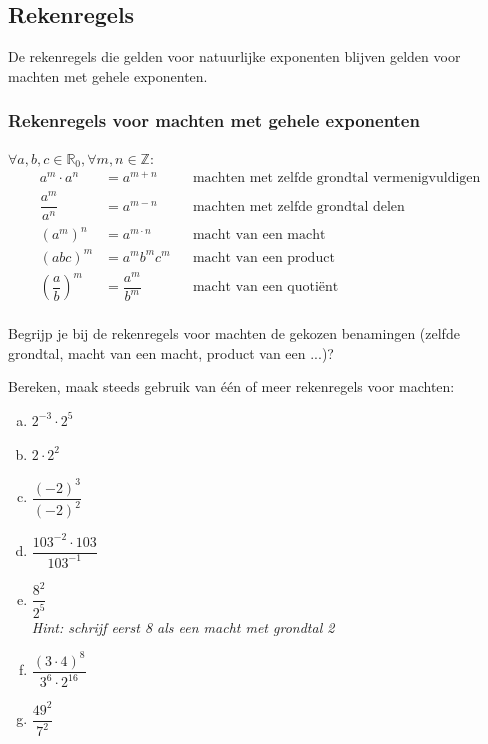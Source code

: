 \documentclass[12pt,twoside,a4paper]{article}
\begin{document}
\subsection{Rekenregels}

De rekenregels die gelden voor natuurlijke exponenten blijven gelden voor machten met gehele exponenten.

\subsubsection*{Rekenregels voor machten met gehele exponenten}
\begin{mdframed}
$\forall a, b, c \in \mathbb{R}_0, \forall m, n\in \mathbb{Z}:$
\begin{align*}
a^m\cdot a^n &= a^{m+n} && \mbox{machten met zelfde grondtal vermenigvuldigen}\\
\dfrac{a^m}{a^n} &= a^{m-n} && \mbox{machten met zelfde grondtal delen}\\
\left(a^m\right)^n &= a^{m\cdot n} && \mbox{macht van een macht}\\
\left(abc\right)^m &= a^mb^mc^m && \mbox{macht van een product}\\
\left(\dfrac{a}{b}\right)^m &= \dfrac{a^m}{b^m} && \mbox{macht van een quotiënt}\\
\end{align*}
\end{mdframed}

\begin{oefening}
Begrijp je bij de rekenregels voor machten de gekozen benamingen (zelfde grondtal, macht van een macht, product van een ...)?
\end{oefening}

\begin{oefening}
Bereken, maak steeds gebruik van één of meer rekenregels voor machten:
\begin{multicols}{2}
  \begin{enumerate}[(a)]
    \itemsep1em
  \item $2^{-3}\cdot2^5$
  \item $2\cdot 2^2$
  \item $\dfrac{(-2)^3}{(-2)^2}$
  \item $\dfrac{103^{-2}\cdot 103}{103^{-1}}$
  \item $\dfrac{8^2}{2^5}$\\
    {\em\small Hint: schrijf eerst 8 als een macht met grondtal 2}
  \item $\dfrac{\left(3\cdot4\right)^8}{3^6\cdot 2^{16}}$
  \item $\dfrac{49^2}{7^2}$
  \end{enumerate}
\end{multicols}

\end{oefening}
\end{document}
